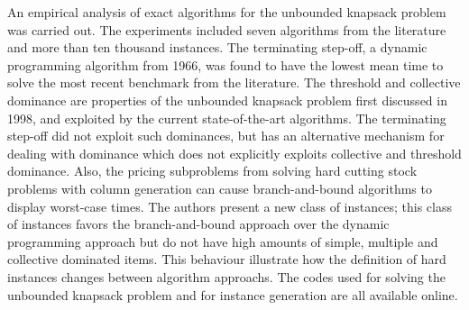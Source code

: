 An empirical analysis of exact algorithms for the unbounded knapsack problem was carried out.
The experiments included seven algorithms from the literature and more than ten thousand instances.
The terminating step-off, a dynamic programming algorithm from 1966, was found to have the lowest mean time to solve the most recent benchmark from the literature.
The threshold and collective dominance are properties of the unbounded knapsack problem first discussed in 1998, and exploited by the current state-of-the-art algorithms. 
The terminating step-off did not exploit such dominances, but has an alternative mechanism for dealing with dominance which does not explicitly exploits collective and threshold dominance.
Also, the pricing subproblems from solving hard cutting stock problems with column generation can cause branch-and-bound algorithms to display worst-case times.
The authors present a new class of instances; this class of instances favors the branch-and-bound approach over the dynamic programming approach but do not have high amounts of simple, multiple and collective dominated items.
This behaviour illustrate how the definition of hard instances changes between algorithm approachs.
The codes used for solving the unbounded knapsack problem and for instance generation are all available online.
